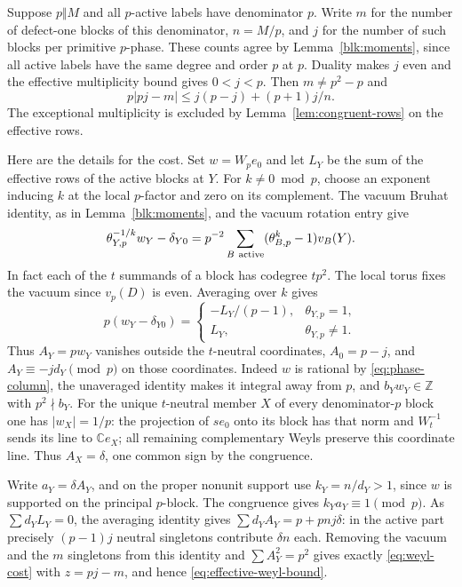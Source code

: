 \documentclass[11pt]{amsart}
\numberwithin{equation}{section}
\theoremstyle{definition}
\theoremstyle{plain}
\newcommand{\ZZ}{\mathbb Z}
\begin{document}
Suppose $p\Vert M$ and all $p$-active labels have denominator $p$.
Write $m$ for the number of defect-one blocks of this denominator,
$n=M/p$, and $j$ for the number of such blocks per primitive $p$-phase.
These counts agree by Lemma~\ref{blk:moments}, since all active
labels have the same degree and order $p$ at $p$. Duality makes $j$
even and the effective multiplicity bound gives $0<j<p$.
Then $m\ne p^2-p$ and
\begin{equation}\label{eq:effective-weyl-bound}
           p|pj-m|\le j(p-j)+(p+1)j/n .
\end{equation}
The exceptional multiplicity is excluded by
Lemma~\ref{lem:congruent-rows} on the effective rows.

Here are the details for the cost. Set $w=W_pe_0$ and let
$L_Y$ be the sum of the effective rows of the active blocks at $Y$.
For $k\ne0\bmod p$, choose an exponent inducing $k$ at the local
$p$-factor and zero on its complement. The vacuum Bruhat identity,
as in Lemma~\ref{blk:moments}, and the vacuum rotation entry give
\[
  \theta_{Y,p}^{-1/k} w_Y-\delta_{Y0}
     =p^{-2}\sum_{B\ {\rm active}}(\theta_{B,p}^k-1)v_B(Y).
\]
In fact each of the $t$ summands of a block has codegree $tp^2$.
The local torus fixes the vacuum since $v_p(D)$ is even.
Averaging over $k$ gives
\[
 p(w_Y-\delta_{Y0})=
 \begin{cases}
   -L_Y/(p-1),&\theta_{Y,p}=1,\\
   L_Y,&\theta_{Y,p}\ne1 .
 \end{cases}
\]
Thus $A_Y=pw_Y$ vanishes outside the $t$-neutral coordinates,
$A_0=p-j$, and $A_Y\equiv-jd_Y\pmod p$ on those coordinates.
Indeed $w$ is rational by \eqref{eq:phase-column}, the unaveraged
identity makes it integral away from $p$, and $b_Yw_Y\in\ZZ$ with
$p^2\nmid b_Y$. For the unique $t$-neutral member $X$ of every
denominator-$p$ block one has $|w_X|=1/p$: the projection of $se_0$
onto its block has that norm and $W_t^{-1}$ sends its line to
$\mathbb C e_X$; all remaining complementary Weyls preserve this
coordinate line. Thus $A_X=\delta$, one common sign by the congruence.

Write $a_Y=\delta A_Y$, and on the proper nonunit support use
$k_Y=n/d_Y>1$, since $w$ is supported on the principal $p$-block.
The congruence gives $k_Ya_Y\equiv1\pmod p$.
As $\sum d_YL_Y=0$, the averaging identity gives
$\sum d_Y A_Y=p+pnj\delta$:
in the active part precisely $(p-1)j$ neutral singletons contribute
$\delta n$ each. Removing the vacuum and the $m$ singletons from
this identity and $\sum A_Y^2=p^2$ gives exactly
\eqref{eq:weyl-cost} with $z=pj-m$, and hence \eqref{eq:effective-weyl-bound}.
\end{document}
